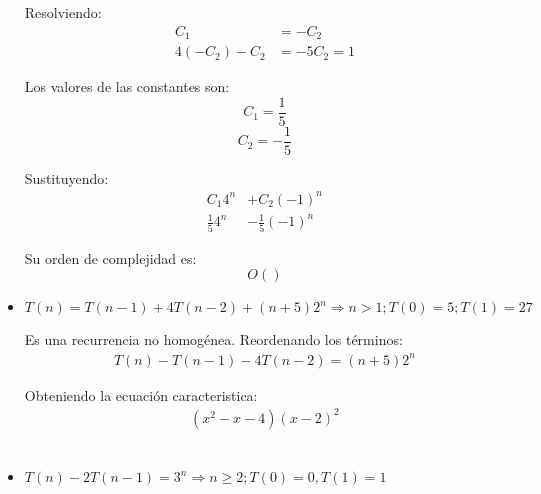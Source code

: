 \documentclass[12pt]{article}
\begin{document}
\begin{itemize}
        Resolviendo:
        \begin{equation*}
          \begin{split}
            C_{1} & = -C_{2}                 \\
            4(-C_{2}) - C_{2} & = -5C_{2} = 1 
          \end{split}
        \end{equation*}

        Los valores de las constantes son:
        $$C_{1} = \frac{1}{5} $$
        $$C_{2} = -\frac{1}{5} $$
        
        Sustituyendo:
        \begin{equation*}
          \begin{split}
            C_{1}4^{n} & + C_{2}(-1)^{n}  \\
            \frac{1}{5}4^{n} & - \frac{1}{5}(-1)^{n}        
          \end{split}
        \end{equation*}

        Su orden de complejidad es:
        $$ O() $$

      \item $T(n) = T(n - 1) + 4T(n - 2) + (n + 5)2^{n} \Rightarrow n > 1; T(0) = 5; T(1) = 27 $
        
        Es una recurrencia no homogénea. Reordenando los términos:
        \begin{equation*}
          \begin{split}
            T(n) - T(n - 1) - 4T(n - 2) = (n + 5)2^{n}                
          \end{split}
        \end{equation*}

        Obteniendo la ecuación caracteristica:
        \begin{equation*}
          \begin{split}
            \left(x^{2} - x - 4\right) \left( x - 2\right)^{2} 
          \end{split}
        \end{equation*}




        \begin{equation*}
          \begin{split}
          \end{split}
        \end{equation*}


      \item $T(n) - 2T(n - 1) = 3^{n} \Rightarrow n \geq 2; T(0) = 0, T(1) = 1$
    \end{itemize}
\end{document}
